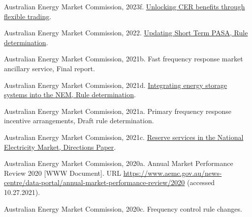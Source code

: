 \documentclass[12pt,a4paper,]{report}
\newlength{\cslhangindent}
\newenvironment{CSLReferences}[2] %
 {%
  \setlength{\parindent}{0pt}
  \ifodd #1 \everypar{\setlength{\hangindent}{\cslhangindent}}\ignorespaces\fi
  \ifnum #2 > 0
  \setlength{\parskip}{#2\baselineskip}
  \fi
 }%
 {}
\begin{document}
\begin{CSLReferences}{1}{0}
\leavevmode{}%
Australian Energy Market Commission, 2023f.
\href{https://www.aemc.gov.au/sites/default/files/2023-08/ERC0346\%20CER\%20Benefits\%20Directions\%20paper\%20-\%20rule\%20change.pdf}{Unlocking
{CER} benefits through flexible trading}.

\leavevmode{}%
Australian Energy Market Commission, 2022.
\href{https://www.aemc.gov.au/sites/default/files/2022-05/ERC0332\%20-\%20Updating\%20Short\%20Term\%20PASA\%20-\%20Final\%20determination.pdf}{Updating
{Short Term PASA}, {Rule} determination}.

\leavevmode{}%
Australian Energy Market Commission, 2021b. Fast frequency response
market ancillary service, {Final} report.

\leavevmode{}%
Australian Energy Market Commission, 2021d.
\href{https://www.aemc.gov.au/sites/default/files/2021-12/1._final_determination_-_integrating_energy_storage_systems_into_the_nem.pdf}{Integrating
energy storage systems into the {NEM}, {Rule} determination}.

\leavevmode{}%
Australian Energy Market Commission, 2021a. Primary frequency response
incentive arrangements, {Draft} rule determination.

\leavevmode{}%
Australian Energy Market Commission, 2021c.
\href{https://www.aemc.gov.au/sites/default/files/2021-01/Reserve\%20services\%20directions\%20paper\%20-\%205.01.2021\%20-\%20FINAL.pdf}{Reserve
services in the {National Electricity Market}, {Directions Paper}}.

\leavevmode{}%
Australian Energy Market Commission, 2020a. Annual {Market Performance
Review} 2020 {[}WWW Document{]}. URL
\url{https://www.aemc.gov.au/news-centre/data-portal/annual-market-performance-review/2020}
(accessed 10.27.2021).

\leavevmode{}%
Australian Energy Market Commission, 2020c. Frequency control rule
changes.


\end{CSLReferences}
\end{document}
